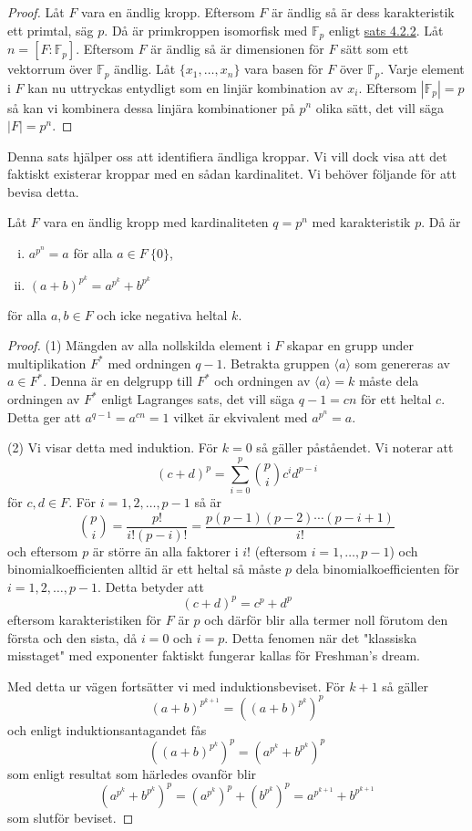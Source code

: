 \documentclass{article}
\theoremstyle{definition}
\begin{document}
\begin{proof}
  Låt $F$ vara en ändlig kropp. Eftersom $F$ är ändlig så är dess karakteristik ett primtal, säg $p$. Då är primkroppen isomorfisk med 
  $\mathbb{F}_p$ enligt \hyperlink{primkropp}{sats 4.2.2}. Låt $n = [F:\mathbb{F}_p].$ Eftersom $F$ är ändlig så är dimensionen för $F$ sätt som ett 
  vektorrum över $\mathbb{F}_p$ ändlig. Låt $\{x_1, \ldots, x_n\}$ vara basen för $F$ över $\mathbb{F}_p.$
  Varje element i $F$ kan nu uttryckas entydligt som en linjär kombination av $x_i$. Eftersom $|\mathbb{F}_p| = p$ så 
  kan vi kombinera dessa linjära kombinationer på $p^n$ olika sätt, det vill säga $|F| = p^n.$
\end{proof}
Denna sats hjälper oss att identifiera ändliga kroppar. Vi vill dock visa att det faktiskt existerar kroppar med en sådan kardinalitet. 
Vi behöver följande för att bevisa detta.

\hypertarget{lemma8.0.1}{}
\begin{mylemma}{}{}
  Låt $F$ vara en ändlig kropp med kardinaliteten $q = p^n$ med karakteristik $p$. Då är 
  \begin{enumerate}[(i)]
    \item $a^{p^n} = a$ för alla $a \in F \ \{0\}$,
    \item $(a + b)^{p^k} = a^{p^k} + b^{p^k}$
  \end{enumerate}
  för alla $a, b \in F$ och icke negativa heltal $k$.
\end{mylemma}
\begin{proof}
  (1) Mängden av alla nollskilda element i $F$ skapar en grupp under multiplikation $F^*$ med ordningen $q-1$. Betrakta 
  gruppen $\langle a \rangle$ som genereras av $a \in F^*$. Denna är en delgrupp till $F^*$ och ordningen av $\langle a \rangle = k$ måste dela 
  ordningen av $F^*$ enligt Lagranges sats, det vill säga $q-1 = cn$ för ett heltal $c$. Detta ger att $a^{q-1} = a^{cn} = 1$ 
  vilket är ekvivalent med $a^{p^n} = a$.

  (2) Vi visar detta med induktion. För $k = 0$ så gäller påståendet. Vi noterar att 
  \[(c + d)^p = \sum^p_{i = 0} \binom{p}{i}c^id^{p-i} \]
  för $c, d \in F$. För $i = 1, 2, \ldots, p-1$ så är 
  \[ \binom{p}{i} = \frac{p!}{i!(p-i)!} = \frac{p(p-1)(p-2)\cdots(p-i+1)}{i!} \]
  och eftersom $p$ är större än alla faktorer i $i!$ (eftersom $i = 1, \ldots, p-1$) och binomialkoefficienten alltid är ett heltal så måste 
  $p$ dela binomialkoefficienten för $i = 1, 2, \ldots, p-1$. Detta betyder att 
  \[(c + d)^p = c^p + d^p\]
  eftersom karakteristiken för $F$ är $p$ och därför blir alla termer noll förutom den första och den sista, då $i = 0$ och $i = p$.
  Detta fenomen när det "klassiska misstaget" med exponenter faktiskt fungerar kallas för Freshman's dream. 

  Med detta ur vägen fortsätter vi med induktionsbeviset. För $k + 1$ så gäller 
  \[ (a + b)^{p^{k+1}} = ((a + b)^{p^{k}})^p \]
  och enligt induktionsantagandet fås
  \[((a + b)^{p^{k}})^p = (a^{p^k} + b^{p^k})^p\]
  som enligt resultat som härledes ovanför blir 
  \[(a^{p^k} + b^{p^k})^p = (a^{p^k})^p + (b^{p^k})^p = a^{p^{k+1}} + b^{p^{k+1}}\]
  som slutför beviset.
\end{proof}
\end{document}
